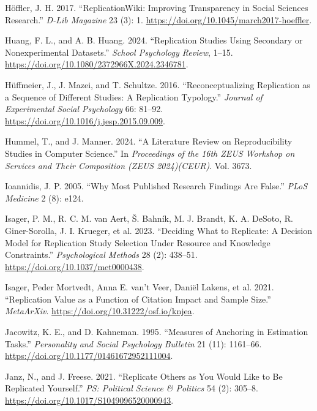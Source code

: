 \documentclass[
  letterpaper,
  DIV=11,
  openany,
  fontsize=12pt,
  parskip=half,
  headings=big,
  numbers=noenddot,
  titlepage=false]{scrreprt}
\newlength{\cslhangindent}
\newenvironment{CSLReferences}[2] %
 {\begin{list}{}{%
  \setlength{\itemindent}{0pt}
  \setlength{\leftmargin}{0pt}
  \setlength{\parsep}{0pt}
  \ifodd #1
   \setlength{\leftmargin}{\cslhangindent}
   \setlength{\itemindent}{-1\cslhangindent}
  \fi
  \setlength{\itemsep}{#2\baselineskip}}}
 {\end{list}}
\begin{document}
\begin{CSLReferences}{1}{0}
Höffler, J. H. 2017. {``ReplicationWiki: Improving Transparency in
Social Sciences Research.''} \emph{D-Lib Magazine} 23 (3): 1.
\url{https://doi.org/10.1045/march2017-hoeffler}.

Huang, F. L., and A. B. Huang. 2024. {``Replication Studies Using
Secondary or Nonexperimental Datasets.''} \emph{School Psychology
Review}, 1--15. \url{https://doi.org/10.1080/2372966X.2024.2346781}.

Hüffmeier, J., J. Mazei, and T. Schultze. 2016. {``Reconceptualizing
Replication as a Sequence of Different Studies: A Replication
Typology.''} \emph{Journal of Experimental Social Psychology} 66:
81--92. \url{https://doi.org/10.1016/j.jesp.2015.09.009}.

Hummel, T., and J. Manner. 2024. {``A Literature Review on
Reproducibility Studies in Computer Science.''} In \emph{Proceedings of
the 16th ZEUS Workshop on Services and Their Composition (ZEUS
2024)(CEUR)}. Vol. 3673.

Ioannidis, J. P. 2005. {``Why Most Published Research Findings Are
False.''} \emph{PLoS Medicine} 2 (8): e124.

Isager, P. M., R. C. M. van Aert, Š. Bahník, M. J. Brandt, K. A. DeSoto,
R. Giner-Sorolla, J. I. Krueger, et al. 2023. {``Deciding What to
Replicate: A Decision Model for Replication Study Selection Under
Resource and Knowledge Constraints.''} \emph{Psychological Methods} 28
(2): 438--51. \url{https://doi.org/10.1037/met0000438}.

Isager, Peder Mortvedt, Anna E. van't Veer, Daniël Lakens, et al. 2021.
{``Replication Value as a Function of Citation Impact and Sample
Size.''} \emph{MetaArXiv}. \url{https://doi.org/10.31222/osf.io/knjea}.

Jacowitz, K. E., and D. Kahneman. 1995. {``Measures of Anchoring in
Estimation Tasks.''} \emph{Personality and Social Psychology Bulletin}
21 (11): 1161--66. \url{https://doi.org/10.1177/01461672952111004}.

Janz, N., and J. Freese. 2021. {``Replicate Others as You Would Like to
Be Replicated Yourself.''} \emph{PS: Political Science \& Politics} 54
(2): 305--8. \url{https://doi.org/10.1017/S1049096520000943}.


\end{CSLReferences}
\end{document}
